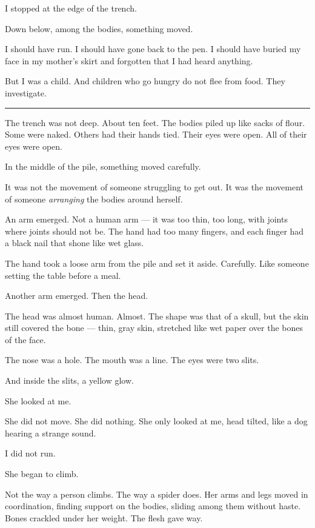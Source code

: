 \noindent I stopped at the edge of the trench.

\noindent Down below, among the bodies, something moved.

\noindent I should have run. I should have gone back to the pen. I should have buried my face in my mother's skirt and forgotten that I had heard anything.

\noindent But I was a child.
And children who go hungry do not flee from food.
They investigate.

\vspace{0.5em}\noindent\rule{\textwidth}{0.5pt}\vspace{0.5em}

\noindent The trench was not deep. About ten feet. The bodies piled up like sacks of flour. Some were naked. Others had their hands tied. Their eyes were open. All of their eyes were open.

\noindent In the middle of the pile, something moved carefully.

\noindent It was not the movement of someone struggling to get out.
It was the movement of someone \textit{arranging} the bodies around herself.

\noindent An arm emerged. Not a human arm --- it was too thin, too long, with joints where joints should not be. The hand had too many fingers, and each finger had a black nail that shone like wet glass.

\noindent The hand took a loose arm from the pile and set it aside. Carefully. Like someone setting the table before a meal.

\noindent Another arm emerged. Then the head.

\noindent The head was almost human. Almost. The shape was that of a skull, but the skin still covered the bone --- thin, gray skin, stretched like wet paper over the bones of the face.

\noindent The nose was a hole.
The mouth was a line.
The eyes were two slits.

\noindent And inside the slits, a yellow glow.

\noindent She looked at me.

\noindent She did not move. She did nothing. She only looked at me, head tilted, like a dog hearing a strange sound.

\noindent I did not run.

\noindent She began to climb.

\noindent Not the way a person climbs. The way a spider does. Her arms and legs moved in coordination, finding support on the bodies, sliding among them without haste. Bones crackled under her weight. The flesh gave way.


